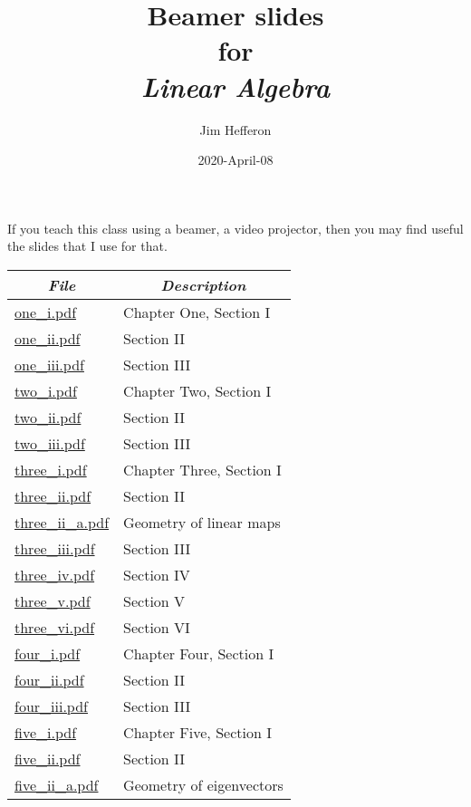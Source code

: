 \documentclass[11pt]{article}
\title{Beamer slides \\
       for \\
       \textit{Linear Algebra}}
\author{Jim Hef{}feron}
\date{2020-April-08}
\begin{document}
\maketitle\thispagestyle{empty}
If you teach this class using a beamer, a video projector, then
you may find useful the slides that I use for that.

\begin{center}\small
\begin{tabular}{l|l}
  \multicolumn{1}{c}{\textit{File}}
     &\multicolumn{1}{c}{\textit{Description}}  \\
  \hline
  \href{file:one/one_i.pdf}{one\_i.pdf}  &Chapter One, Section I  \\
  \href{file:one/one_ii.pdf}{one\_ii.pdf}  &\quad Section II  \\
  \href{file:one/one_iii.pdf}{one\_iii.pdf}  &\quad Section III  \\
  \hline
  \href{file:two/two_i.pdf}{two\_i.pdf}  &Chapter Two, Section I  \\
  \href{file:two/two_ii.pdf}{two\_ii.pdf}  &\quad Section II  \\
  \href{file:two/two_iii.pdf}{two\_iii.pdf}  &\quad Section III  \\
  \hline
  \href{file:three/three_i.pdf}{three\_i.pdf}  &Chapter Three, Section I  \\
  \href{file:three/three_ii.pdf}{three\_ii.pdf}  &\quad Section II  \\
  \href{file:three/three_ii_a.pdf}{three\_ii\_a.pdf}  &\quad Geometry of linear maps  \\
  \href{file:three/three_iii.pdf}{three\_iii.pdf}  &\quad Section III  \\
  \href{file:three/three_iv.pdf}{three\_iv.pdf}  &\quad Section IV  \\
  \href{file:three/three_v.pdf}{three\_v.pdf}  &\quad Section V  \\
  \href{file:three/three_vi.pdf}{three\_vi.pdf}  &\quad Section VI  \\
  \hline
  \href{file:four/four_i.pdf}{four\_i.pdf}  &Chapter Four, Section I  \\
  \href{file:four/four_ii.pdf}{four\_ii.pdf}  &\quad Section II  \\
  \href{file:four/four_iii.pdf}{four\_iii.pdf}  &\quad Section III  \\
  \hline
  \href{file:five/five_i.pdf}{five\_i.pdf}  &\quad Chapter Five, Section I  \\
  \href{file:five/five_ii.pdf}{five\_ii.pdf}  &\quad Section II  \\
  \href{file:five/five_ii_a.pdf}{five\_ii\_a.pdf}  &\quad Geometry of eigenvectors
\end{tabular}
\end{center}
\end{document}
